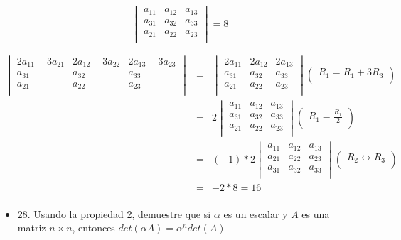 \documentclass[
]{article}
\begin{document}
\[\begin{vmatrix}
a_{11} & a_{12} & a_{13} \\
a_{31} & a_{32} & a_{33} \\
a_{21} & a_{22} & a_{23} \\
\end{vmatrix} = 8\]

\[\begin{matrix}
\begin{vmatrix}
2a_{11} - 3a_{21} & 2a_{12} - 3a_{22} & 2a_{13} - 3a_{23} \\
a_{31} & a_{32} & a_{33} \\
a_{21} & a_{22} & a_{23} \\
\end{vmatrix} & = & \begin{vmatrix}
2a_{11} & 2a_{12} & 2a_{13} \\
a_{31} & a_{32} & a_{33} \\
a_{21} & a_{22} & a_{23} \\
\end{vmatrix}\begin{pmatrix}
R_{1} = R_{1} + 3R_{3} \\
\end{pmatrix} \\
 & = & 2\begin{vmatrix}
a_{11} & a_{12} & a_{13} \\
a_{31} & a_{32} & a_{33} \\
a_{21} & a_{22} & a_{23} \\
\end{vmatrix}\begin{pmatrix}
R_{1} = \frac{R_{1}}{2} \\
\end{pmatrix} \\
 & = & ( - 1)*2\begin{vmatrix}
a_{11} & a_{12} & a_{13} \\
a_{21} & a_{22} & a_{23} \\
a_{31} & a_{32} & a_{33} \\
\end{vmatrix}\begin{pmatrix}
R_{2} \leftrightarrow R_{3} \\
\end{pmatrix} \\
 & = & - 2*8 = 16 \\
\end{matrix}\]

\begin{itemize}
\item
  28. Usando la propiedad 2, demuestre que si \(\alpha\) es un escalar y
  \(A\) es una matriz \(n \times n\), entonces
  \(det(\alpha A) = \alpha^{n}det(A)\)
\end{itemize}
\end{document}
